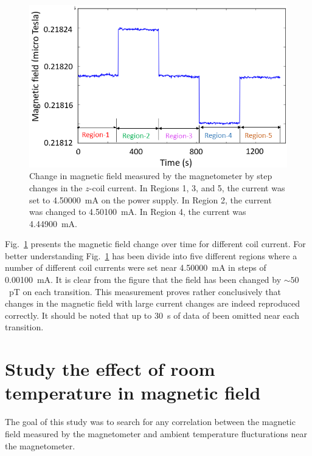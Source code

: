 \begin{figure}%
\centering
\includegraphics[width=0.7\linewidth]{figures/field_change-with-current}  
\caption{Change in magnetic field measured by the magnetometer by step
  changes in the $z$-coil current.  In Regions 1, 3, and 5, the
  current was set to 4.50000~mA on the power supply.  In Region 2, the
  current was changed to 4.50100~mA.  In Region 4, the current was
  4.44900~mA.\label{fig:field-change}}
\end{figure} 
 
Fig.~\ref{fig:field-change} presents the magnetic field change over
time for different coil current. For better understanding
Fig.~\ref{fig:field-change} has been divide into five different
regions where a number of different coil currents were set near
4.50000~mA in steps of 0.00100~mA.  It is clear from the figure that
the field has been changed by $\sim 50$~pT on each transition.  This
measurement proves rather conclusively that changes in the magnetic
field with large current changes are indeed reproduced correctly.  It
should be noted that up to 30~s of data of been omitted near each
transition.


\section{Study the effect of room temperature in magnetic field} 

The goal of this study was to search for any correlation between the
magnetic field measured by the magnetometer and ambient temperature
flucturations near the magnetometer.

